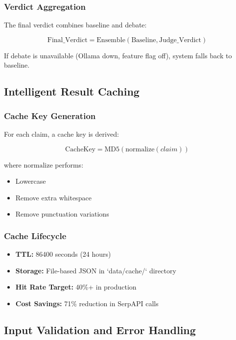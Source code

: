 \documentclass[12pt,a4paper,twoside]{article}
\begin{document}
\subsubsection{Verdict Aggregation}

The final verdict combines baseline and debate:

\[\text{Final\_Verdict} = \text{Ensemble}(\text{Baseline}, \text{Judge\_Verdict})\]

If debate is unavailable (Ollama down, feature flag off), system falls back to baseline.

\subsection{Intelligent Result Caching}

\subsubsection{Cache Key Generation}

For each claim, a cache key is derived:

\[\text{CacheKey} = \text{MD5}(\text{normalize}(claim))\]

where $\text{normalize}$ performs:
\begin{itemize}
    \item Lowercase
    \item Remove extra whitespace
    \item Remove punctuation variations
\end{itemize}

\subsubsection{Cache Lifecycle}

\begin{itemize}
    \item \textbf{TTL:} 86400 seconds (24 hours)
    \item \textbf{Storage:} File-based JSON in `data/cache/` directory
    \item \textbf{Hit Rate Target:} 40\%+ in production
    \item \textbf{Cost Savings:} 71\% reduction in SerpAPI calls
\end{itemize}

\subsection{Input Validation and Error Handling}
\end{document}
